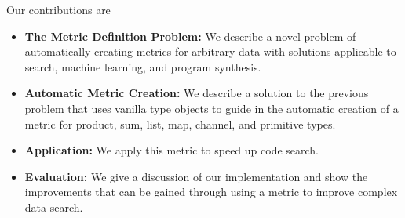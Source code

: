 Our contributions are 

\begin{itemize}
    \item \textbf{The Metric Definition Problem: }
    We describe a novel problem of automatically creating metrics for arbitrary data
    with solutions applicable to search, machine learning, and program synthesis.
    \item \textbf{Automatic Metric Creation: }
    We describe a solution to the previous problem that uses vanilla type objects
    to guide in the automatic creation of a metric for product, sum, list, map, channel, and primitive types.
    \item \textbf{Application: }
    We apply this metric to speed up code search.
    \item \textbf{Evaluation: }
    We give a discussion of our implementation and show the improvements that can be gained through using 
    a metric to improve complex data search.
\end{itemize}